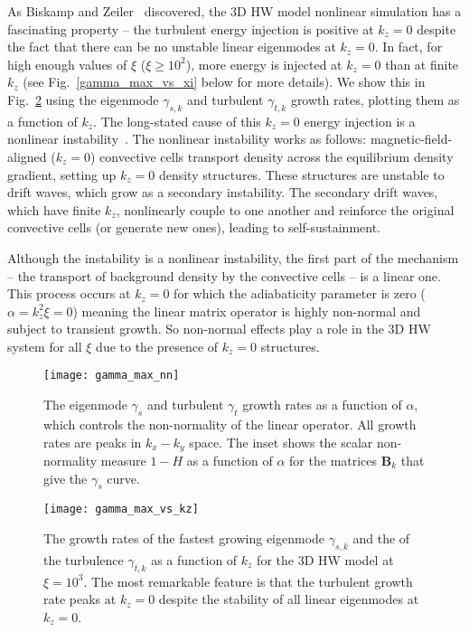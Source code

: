 \documentclass[twocolumn,showkeys,superscriptaddress]{revtex4}
\begin{document}
As Biskamp and Zeiler~\cite{biskamp1995} discovered, the 3D HW model nonlinear simulation has a fascinating property -- 
the turbulent energy injection is positive at $k_z = 0$ despite the fact that there can be no unstable linear eigenmodes at $k_z=0$.
In fact, for high enough values of $\xi$ ($\xi \ge 10^2$), more energy is injected at $k_z = 0$ than at finite $k_z$ (see Fig.~\ref{gamma_max_vs_xi} below for more details).
We show this in Fig.~\ref{gamma_max_vs_kz} using the eigenmode $\gamma_{s,k}$ and turbulent $\gamma_{t,k}$ growth rates, plotting them as a function of $k_z$.
The long-stated cause of this $k_z=0$ energy injection is a nonlinear instability~\cite{biskamp1995,drake1995}. 
The nonlinear instability works as follows: magnetic-field-aligned ($k_z=0$) convective cells transport density across the equilibrium density gradient, setting up $k_z=0$ density structures. 
These structures are unstable to drift waves, which grow as a secondary instability.
The secondary drift waves, which have finite $k_z$, nonlinearly couple to one another and reinforce the original convective cells (or generate new ones), leading to self-sustainment.

Although the instability is a nonlinear instability, the first part of the mechanism -- the transport of background density by the convective cells -- is a linear one. This process occurs at $k_z=0$
for which the adiabaticity parameter is zero ($\alpha = k_z^2 \xi = 0$) meaning the linear matrix operator is highly non-normal and subject to transient growth.
So non-normal effects play a role in the 3D HW system for all $\xi$ due to the presence of $k_z=0$ structures.

\begin{figure}
\centerline{\texttt{[image: gamma\_max\_nn]}}
\caption{The eigenmode $\gamma_{s}$ and turbulent $\gamma_{t}$ growth rates as a function of $\alpha$, which controls the non-normality of the linear operator. All growth rates are peaks in $k_x-k_y$ space.
The inset shows the scalar non-normality measure $1-H$ as a function of $\alpha$ for the matrices $\mathbf{B}_k$ that give the $\gamma_{s}$ curve.}
\label{gamma_max_vs_alpha}
\end{figure}

\begin{figure}
\centerline{\texttt{[image: gamma\_max\_vs\_kz]}}
\caption{The growth rates of the fastest growing eigenmode $\gamma_{s,k}$ and the of the turbulence $\gamma_{t,k}$ as a function of $k_z$ for the 3D HW model at $\xi = 10^3$. The most remarkable feature is
that the turbulent growth rate peaks at $k_z=0$ despite the stability of all linear eigenmodes at $k_z=0$.}
\label{gamma_max_vs_kz}
\end{figure}
\end{document}
